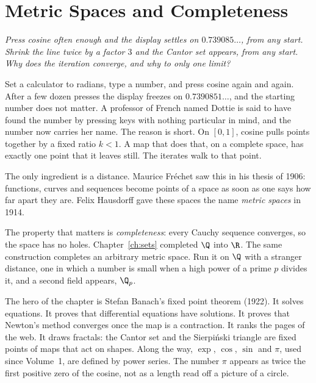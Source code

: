 \chapter{Metric Spaces and Completeness}\label{ch:metric}

\begin{center}\itshape
Press cosine often enough and the display settles on $0.739085\ldots$, from any start. Shrink the line twice by a factor $3$ and the Cantor set appears, from any start. Why does the iteration converge, and why to only one limit?
\end{center}

Set a calculator to radians, type a number, and press cosine again and again. After a few dozen presses the display freezes on $0.7390851\ldots$, and the starting number does not matter. A professor of French named Dottie is said to have found the number by pressing keys with nothing particular in mind, and the number now carries her name. The reason is short. On $[0,1]$, cosine pulls points together by a fixed ratio $k<1$. A map that does that, on a complete space, has exactly one point that it leaves still. The iterates walk to that point.

The only ingredient is a distance. Maurice Fr\'echet saw this in his thesis of 1906: functions, curves and sequences become points of a space as soon as one says how far apart they are. Felix Hausdorff gave these spaces the name \emph{metric spaces} in 1914.


The property that matters is \emph{completeness}: every Cauchy sequence converges, so the space has no holes. Chapter~\ref{ch:sets} completed $\Q$ into $\R$. The same construction completes an arbitrary metric space. Run it on $\Q$ with a stranger distance, one in which a number is small when a high power of a prime $p$ divides it, and a second field appears, $\Q_p$.

The hero of the chapter is Stefan Banach's fixed point theorem (1922). It solves equations. It proves that differential equations have solutions. It proves that Newton's method converges once the map is a contraction. It ranks the pages of the web. It draws fractals: the Cantor set and the Sierpi\'nski triangle are fixed points of maps that act on shapes. Along the way, $\exp$, $\cos$, $\sin$ and $\pi$, used since Volume~1, are defined by power series. The number $\pi$ appears as twice the first positive zero of the cosine, not as a length read off a picture of a circle.

